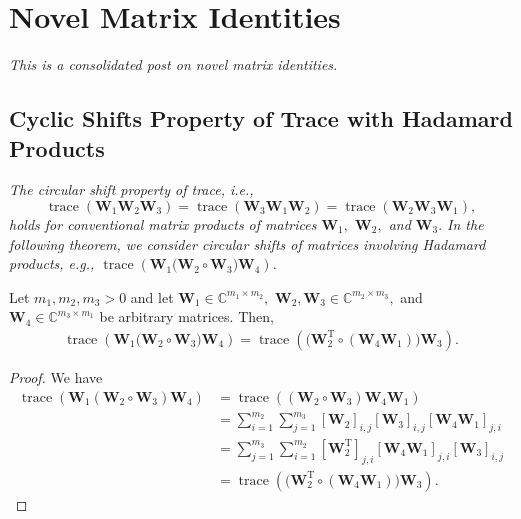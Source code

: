 \section{Novel Matrix Identities}

\emph{This is a consolidated post on novel matrix identities.}

\subsection{Cyclic Shifts Property of Trace with Hadamard Products}

\emph{The circular shift property of trace, i.e., 
\begin{equation*}
	\operatorname{trace}\left(\boldsymbol{W}_1\boldsymbol{W}_2\boldsymbol{W}_3\right) = \operatorname{trace}\left(\boldsymbol{W}_3\boldsymbol{W}_1\boldsymbol{W}_2\right) = \operatorname{trace}\left(\boldsymbol{W}_2\boldsymbol{W}_3\boldsymbol{W}_1\right),
\end{equation*}
holds for conventional matrix products of matrices $\boldsymbol{W}_1,$ $\boldsymbol{W}_2,$ and $\boldsymbol{W}_3.$ In the following theorem, we consider circular shifts of matrices involving Hadamard products, e.g., $\operatorname{trace}\left(\boldsymbol{W}_1\big(\boldsymbol{W}_2 \circ \boldsymbol{W}_3\big) \boldsymbol{W}_4\right).$}

\begin{theorem}
	\label{lemma:htoc}
	Let $m_1, m_2, m_3 > 0$ and let $\boldsymbol{W}_1 \in \mathbb{C}^{m_1\times m_2},$ $\boldsymbol{W}_2, \boldsymbol{W}_3 \in \mathbb{C}^{m_2\times m_3},$ and $\boldsymbol{W}_4 \in \mathbb{C}^{m_3\times m_1}$ be arbitrary matrices. Then,
	\begin{align}
		\operatorname{trace}\left(\boldsymbol{W}_1\big(\boldsymbol{W}_2 \circ \boldsymbol{W}_3\big) \boldsymbol{W}_4\right) = \operatorname{trace}\left(\big(\boldsymbol{W}_2^{\mathrm{T}} \circ (\boldsymbol{W}_4\boldsymbol{W}_1)\big) \boldsymbol{W}_3\right). \label{eqn:trh}
	\end{align}
\end{theorem}
\begin{proof}
	We have
	\begin{align}
		\operatorname{trace}\left(\boldsymbol{W}_1(\boldsymbol{W}_2 \circ \boldsymbol{W}_3) \boldsymbol{W}_4\right) &= \operatorname{trace}\left((\boldsymbol{W}_2 \circ \boldsymbol{W}_3) \boldsymbol{W}_4\boldsymbol{W}_1\right) \nonumber\\ &= \sum_{i=1}^{m_2} \sum_{j=1}^{m_3} [\boldsymbol{W}_2]_{i,j}[\boldsymbol{W}_3]_{i,j} [\boldsymbol{W}_4\boldsymbol{W}_1]_{j,i} \nonumber\\
		&= \sum_{j=1}^{m_3} \sum_{i=1}^{m_2}  [\boldsymbol{W}_2^{\mathrm{T}}]_{j,i} [\boldsymbol{W}_4\boldsymbol{W}_1]_{j,i} [\boldsymbol{W}_3]_{i,j} \nonumber\\&= \operatorname{trace}\left(\big(\boldsymbol{W}_2^{\mathrm{T}} \circ (\boldsymbol{W}_4\boldsymbol{W}_1)\big) \boldsymbol{W}_3\right).
	\end{align}
\end{proof}

